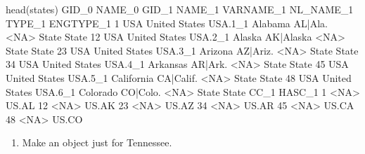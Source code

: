 \documentclass[
]{book}
\newenvironment{Shaded}{\begin{snugshade}}{\end{snugshade}}
\newcommand{\ConstantTok}[1]{\textcolor[rgb]{0.00,0.00,0.00}{#1}}
\newcommand{\DecValTok}[1]{\textcolor[rgb]{0.00,0.00,0.81}{#1}}
\newcommand{\FloatTok}[1]{\textcolor[rgb]{0.00,0.00,0.81}{#1}}
\newcommand{\FunctionTok}[1]{\textcolor[rgb]{0.00,0.00,0.00}{#1}}
\newcommand{\NormalTok}[1]{#1}
\newcommand{\SpecialCharTok}[1]{\textcolor[rgb]{0.00,0.00,0.00}{#1}}
\providecommand{\tightlist}{%
  \setlength{\itemsep}{0pt}\setlength{\parskip}{0pt}}
\begin{document}
\begin{Shaded}
\begin{Highlighting}[]
\FunctionTok{head}\NormalTok{(states)}
\NormalTok{   GID\_0        NAME\_0   GID\_1     NAME\_1 VARNAME\_1 NL\_NAME\_1 TYPE\_1 ENGTYPE\_1}
\DecValTok{1}\NormalTok{    USA United States USA}\FloatTok{.1}\NormalTok{\_1    Alabama   AL}\SpecialCharTok{|}\NormalTok{Ala.      }\SpecialCharTok{\textless{}}\ConstantTok{NA}\SpecialCharTok{\textgreater{}}\NormalTok{  State     State}
\DecValTok{12}\NormalTok{   USA United States USA}\FloatTok{.2}\NormalTok{\_1     Alaska AK}\SpecialCharTok{|}\NormalTok{Alaska      }\SpecialCharTok{\textless{}}\ConstantTok{NA}\SpecialCharTok{\textgreater{}}\NormalTok{  State     State}
\DecValTok{23}\NormalTok{   USA United States USA}\FloatTok{.3}\NormalTok{\_1    Arizona  AZ}\SpecialCharTok{|}\NormalTok{Ariz.      }\SpecialCharTok{\textless{}}\ConstantTok{NA}\SpecialCharTok{\textgreater{}}\NormalTok{  State     State}
\DecValTok{34}\NormalTok{   USA United States USA}\FloatTok{.4}\NormalTok{\_1   Arkansas   AR}\SpecialCharTok{|}\NormalTok{Ark.      }\SpecialCharTok{\textless{}}\ConstantTok{NA}\SpecialCharTok{\textgreater{}}\NormalTok{  State     State}
\DecValTok{45}\NormalTok{   USA United States USA}\FloatTok{.5}\NormalTok{\_1 California CA}\SpecialCharTok{|}\NormalTok{Calif.      }\SpecialCharTok{\textless{}}\ConstantTok{NA}\SpecialCharTok{\textgreater{}}\NormalTok{  State     State}
\DecValTok{48}\NormalTok{   USA United States USA}\FloatTok{.6}\NormalTok{\_1   Colorado  CO}\SpecialCharTok{|}\NormalTok{Colo.      }\SpecialCharTok{\textless{}}\ConstantTok{NA}\SpecialCharTok{\textgreater{}}\NormalTok{  State     State}
\NormalTok{   CC\_1 HASC\_1}
\DecValTok{1}  \SpecialCharTok{\textless{}}\ConstantTok{NA}\SpecialCharTok{\textgreater{}}\NormalTok{  US.AL}
\DecValTok{12} \SpecialCharTok{\textless{}}\ConstantTok{NA}\SpecialCharTok{\textgreater{}}\NormalTok{  US.AK}
\DecValTok{23} \SpecialCharTok{\textless{}}\ConstantTok{NA}\SpecialCharTok{\textgreater{}}\NormalTok{  US.AZ}
\DecValTok{34} \SpecialCharTok{\textless{}}\ConstantTok{NA}\SpecialCharTok{\textgreater{}}\NormalTok{  US.AR}
\DecValTok{45} \SpecialCharTok{\textless{}}\ConstantTok{NA}\SpecialCharTok{\textgreater{}}\NormalTok{  US.CA}
\DecValTok{48} \SpecialCharTok{\textless{}}\ConstantTok{NA}\SpecialCharTok{\textgreater{}}\NormalTok{  US.CO}
\end{Highlighting}
\end{Shaded}

\begin{enumerate}
\def\labelenumi{\arabic{enumi}.}
\setcounter{enumi}{12}
\tightlist
\item
  Make an object just for Tennessee.
\end{enumerate}
\end{document}
